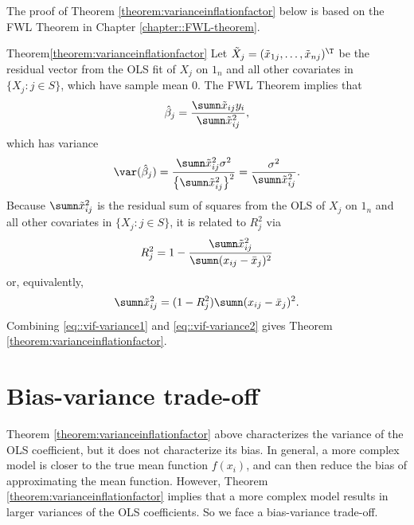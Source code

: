 The proof of Theorem \ref{theorem:varianceinflationfactor} below is based
on the FWL Theorem in Chapter \ref{chapter::FWL-theorem}.




\begin{myproof}{Theorem}{\ref{theorem:varianceinflationfactor}}
Let $\tilde{X}_{j} = (\tilde{x}_{1j}, \ldots, \tilde{x}_{nj})^{\T}$ be the residual vector from the OLS fit of $X_{j}$
on $1_{n}$ and all other covariates in $\{X_{j}: j \in S\}$, which have sample mean 0. The FWL Theorem implies that 
\[
\hat{\beta}_{j}=\frac{\sumn\tilde{x}_{ij}y_{i}}{\sumn\tilde{x}_{ij}^{2}} , 
\]
which has variance
\begin{equation}\label{eq::vif-variance1}
\var(\hat{\beta}_{j})=\frac{\sumn\tilde{x}_{ij}^{2}\sigma^{2}}{\left\{ \sumn\tilde{x}_{ij}^{2}\right\} ^{2}}=\frac{\sigma^{2}}{\sumn\tilde{x}_{ij}^{2}}.
\end{equation}
Because $\sumn\tilde{x}_{ij}^{2}$ is the residual sum of squares
from the OLS of $X_{j}$ on $1_{n}$ and all other covariates in $\{X_{j}: j \in S\}$, it is
related to $R_{j}^{2}$ via
\[
R_{j}^{2}=1-\frac{\sumn\tilde{x}_{ij}^{2}}{\sumn(x_{ij}-\bar{x}_{j})^{2}}
\]
or, equivalently,
\begin{equation}\label{eq::vif-variance2}
\sumn\tilde{x}_{ij}^{2}=(1-R_{j}^{2})\sumn(x_{ij}-\bar{x}_{j})^{2}.
\end{equation}
Combining \eqref{eq::vif-variance1} and \eqref{eq::vif-variance2} gives Theorem \ref{theorem:varianceinflationfactor}. 
\end{myproof}





\section{Bias-variance trade-off}

Theorem \ref{theorem:varianceinflationfactor} above characterizes the variance
of the OLS coefficient, but it does not characterize its bias. In
general,   a more complex model is closer to
the true mean function $f(x_i)$, and can then reduce the bias of approximating the mean function.
However, Theorem \ref{theorem:varianceinflationfactor} implies that a more complex model results in larger variances of the OLS
coefficients. So we face a bias-variance trade-off. 



